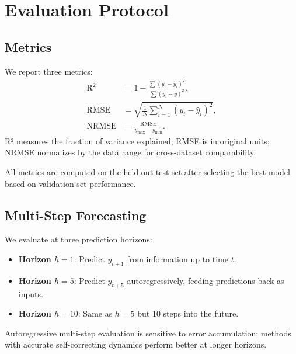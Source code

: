 

\section{Evaluation Protocol}
\label{sec:eval_protocol}


\subsection{Metrics}

We report three metrics:
\begin{subequations}
\label{eq:metrics}
\begin{align}
\mathrm{R^2} &= 1 - \frac{\sum (y_i - \hat y_i)^2}
                         {\sum (y_i - \bar y)^2}, \\[4pt]
\mathrm{RMSE} &= \sqrt{\frac{1}{N}\sum_{i=1}^N (y_i - \hat y_i)^2}, \\[4pt]
\mathrm{NRMSE} &= \frac{\mathrm{RMSE}}{y_{\max} - y_{\min}}.
\end{align}
\end{subequations}
R² measures the fraction of variance explained; RMSE is in original units;
NRMSE normalizes by the data range for cross-dataset comparability.


All metrics are computed on the held-out test set after selecting the
best model based on validation set performance.


\subsection{Multi-Step Forecasting}

We evaluate at three prediction horizons:
\begin{itemize}
  \item \textbf{Horizon $h=1$}: Predict $y_{t+1}$ from information up to time $t$.
  \item \textbf{Horizon $h=5$}: Predict $y_{t+5}$ autoregressively, feeding
    predictions back as inputs.
  \item \textbf{Horizon $h=10$}: Same as $h=5$ but 10 steps into the future.
\end{itemize}
Autoregressive multi-step evaluation is sensitive to error accumulation;
methods with accurate self-correcting dynamics perform better at longer
horizons.

